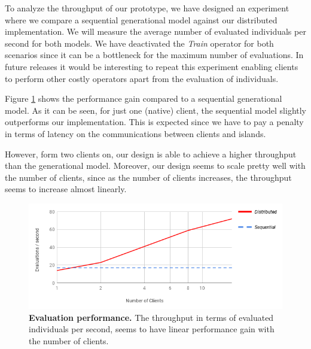 To analyze the throughput of our prototype, we have designed an experiment where we compare a sequential generational model against our distributed implementation. We will measure the average number of evaluated individuals per second for both models. We have deactivated the \textit{Train} operator for both scenarios since it can be a bottleneck for the maximum number of evaluations. In future releases it would be interesting to repeat this experiment enabling clients to perform other costly operators apart from the evaluation of individuals.

Figure \ref{fig:evaluations_experiment} shows the performance gain compared to a sequential generational model. As it can be seen, for just one (native) client, the sequential model slightly outperforms our implementation. This is expected since we have to pay a penalty in terms of latency on the communications between clients and islands.

However, form two clients on, our design is able to achieve a higher throughput than the generational model. Moreover, our design seems to scale pretty well with the number of clients, since as the number of clients increases, the throughput seems to increase almost linearly.

\begin{figure}[h!]
		\centering
    	\includegraphics[width=\linewidth]{assets/images/experiment-evaluations-second.png}
    	\caption{\textbf{Evaluation performance.} The throughput in terms of evaluated individuals per second, seems to have linear performance gain with the number of clients.}
    	\label{fig:evaluations_experiment}
\end{figure}

